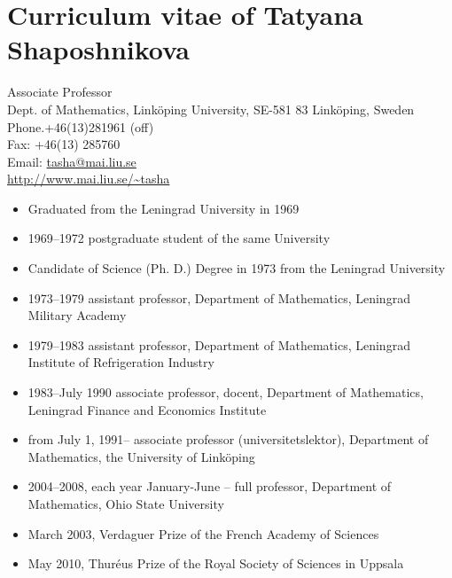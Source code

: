 \documentclass{article}
\begin{document}
\parindent=0pt
\addtolength{\parskip}{4pt}
\addtolength{\textwidth}{10em}
\addtolength{\textheight}{12em}
\def\tc{\mathaccent"7017}


\section*{Curriculum vitae of Tatyana Shaposhnikova}

\noindent
Associate Professor\\
Dept. of Mathematics, Link\"oping University, SE-581 83 Link\"oping, Sweden\\
Phone.+46(13)281961 (off)\\
Fax: +46(13) 285760\\
Email: \href{mailto:tasha@mai.liu.se}{tasha@mai.liu.se}\\
\url{http://www.mai.liu.se/~tasha}


\begin{itemize}
         \item Graduated from the Leningrad University in 1969
         \item 1969--1972 postgraduate student of the same University
         \item Candidate of Science (Ph. D.) Degree in 1973 from the 
Leningrad University
\end{itemize}

\begin{itemize}
         \item 1973--1979  assistant professor, Department of 
Mathematics, Leningrad
          Military Academy
         \item 1979--1983  assistant professor, Department of 
Mathematics, Leningrad
          Institute of Refrigeration Industry
          \item 1983--July 1990  associate professor, docent, 
Department of Mathematics, Leningrad Finance
         and Economics Institute
          \item from July 1, 1991--  associate professor 
(universitetslektor), Department of Mathematics, the
         University of Link\"oping
         \item 2004--2008, each year January-June -- full professor, Department of Mathematics, Ohio State University
\end{itemize}

\begin{itemize}
         \item March 2003, Verdaguer Prize of the French Academy of Sciences
         \item May 2010, Thur\'eus Prize of the Royal Society of Sciences in Uppsala
\end{itemize}
\end{document}
